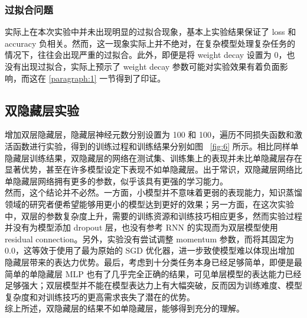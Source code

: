 \documentclass{article}
\begin{document}
\subsubsection{过拟合问题}

实际上在本次实验中并未出现明显的过拟合现象，基本上实验结果保证了 loss 和 accuracy 负相关。然而，这一现象实际上并不绝对，在复杂模型处理复杂任务的情况下，往往会出现严重的过拟合。此外，即便是将 weight decay 设置为 0，也没有出现过拟合，实际上预示了 weight decay 参数可能对实验效果有着负面影响，而这在 \ref{paragraph:1} 一节得到了印证。

\subsection{双隐藏层实验}

增加双层隐藏层，隐藏层神经元数分别设置为 100 和 100，遍历不同损失函数和激活函数进行实验，得到的训练过程和训练结果分别如图 ~\ref{fig:6} 所示。相比同样单隐藏层训练结果，双隐藏层的网络在测试集、训练集上的表现并未比单隐藏层存在显著优势，甚至在许多模型设定下表现不如单隐藏层。出于常识，双隐藏层网络比单隐藏层网络拥有更多的参数，似乎该具有更强的学习能力。\\
然而，这个结论并不必然。一方面，小模型并不意味着更弱的表现能力，知识蒸馏领域的研究者便希望能够用更小的模型达到更好的效果；另一方面，在这次实验中，双层的参数复杂度上升，需要的训练资源和训练技巧相应更多，然而实验过程并没有为模型添加 dropout 层，也没有参考 RNN 的实现而为双层模型使用 residual connection。另外，实验没有尝试调整 momentum 参数，而将其固定为 0.0，这等效于使用了最为原始的 SGD 优化器，进一步致使模型难以体现出增加隐藏层带来的表达力优势。最后，考虑到十分类任务本身已经足够简单，即便是最简单的单隐藏层 MLP 也有了几乎完全正确的结果，可见单层模型的表达能力已经足够强大；双层模型并不能在模型表达力上有大幅突破，反而因为训练难度、模型复杂度和对训练技巧的更高需求丧失了潜在的优势。\\
综上所述，双隐藏层的结果不如单隐藏层，能够得到充分的理解。
\end{document}
